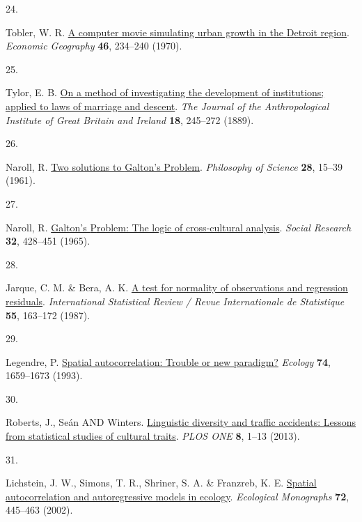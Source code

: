 \documentclass[
  man,floatsintext]{apa6}
\newlength{\cslhangindent}
\newlength{\csllabelwidth}
\newlength{\cslentryspacingunit} %
\newenvironment{CSLReferences}[2] %
 {%
  \setlength{\parindent}{0pt}
  \ifodd #1
  \let\oldpar\par
  \def\par{\hangindent=\cslhangindent\oldpar}
  \fi
  \setlength{\parskip}{#2\cslentryspacingunit}
 }%
 {}
\newcommand{\CSLLeftMargin}[1]{\parbox[t]{\csllabelwidth}{#1}}
\newcommand{\CSLRightInline}[1]{\parbox[t]{\linewidth - \csllabelwidth}{#1}\break}
\begin{document}
\begin{CSLReferences}{0}{0}
\leavevmode{}%
\CSLLeftMargin{24. }%
\CSLRightInline{Tobler, W. R. \href{https://doi.org/10.2307/143141}{A computer movie simulating urban growth in the {D}etroit region}. \emph{Economic Geography} \textbf{46}, 234--240 (1970).}

\leavevmode{}%
\CSLLeftMargin{25. }%
\CSLRightInline{Tylor, E. B. \href{https://doi.org/10.2307/2842423}{On a method of investigating the development of institutions; applied to laws of marriage and descent}. \emph{The Journal of the Anthropological Institute of Great Britain and Ireland} \textbf{18}, 245--272 (1889).}

\leavevmode{}%
\CSLLeftMargin{26. }%
\CSLRightInline{Naroll, R. \href{https://doi.org/10.1086/287778}{Two solutions to {G}alton's {P}roblem}. \emph{Philosophy of Science} \textbf{28}, 15--39 (1961).}

\leavevmode{}%
\CSLLeftMargin{27. }%
\CSLRightInline{Naroll, R. \href{http://www.jstor.org/stable/40969817}{Galton's {P}roblem: The logic of cross-cultural analysis}. \emph{Social Research} \textbf{32}, 428--451 (1965).}

\leavevmode{}%
\CSLLeftMargin{28. }%
\CSLRightInline{Jarque, C. M. \& Bera, A. K. \href{https://doi.org/10.2307/1403192}{A test for normality of observations and regression residuals}. \emph{International Statistical Review / Revue Internationale de Statistique} \textbf{55}, 163--172 (1987).}

\leavevmode{}%
\CSLLeftMargin{29. }%
\CSLRightInline{Legendre, P. \href{https://doi.org/10.2307/1939924}{Spatial autocorrelation: Trouble or new paradigm?} \emph{Ecology} \textbf{74}, 1659--1673 (1993).}

\leavevmode{}%
\CSLLeftMargin{30. }%
\CSLRightInline{Roberts, J., Seán AND Winters. \href{https://doi.org/10.1371/journal.pone.0070902}{Linguistic diversity and traffic accidents: Lessons from statistical studies of cultural traits}. \emph{PLOS ONE} \textbf{8}, 1--13 (2013).}

\leavevmode{}%
\CSLLeftMargin{31. }%
\CSLRightInline{Lichstein, J. W., Simons, T. R., Shriner, S. A. \& Franzreb, K. E. \href{https://doi.org/10.1890/0012-9615(2002)072\%5B0445:SAAAMI\%5D2.0.CO;2}{Spatial autocorrelation and autoregressive models in ecology}. \emph{Ecological Monographs} \textbf{72}, 445--463 (2002).}


\end{CSLReferences}
\end{document}

